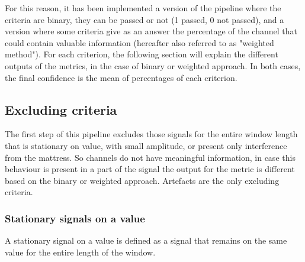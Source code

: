 For this reason, it has been implemented a version of the pipeline where the criteria are binary, they can be passed or not (1 passed, 0 not passed), and a version where some criteria give as an answer the percentage of the channel that could contain valuable information (hereafter also referred to as "weighted method"). For each criterion, the following section will explain the different outputs of the metrics, in the case of binary or weighted approach.
In both cases, the final confidence is the mean of percentages of each criterion.


\subsection{Excluding criteria}\label{cap:excCrit}
The first step of this pipeline excludes those signals for the entire window length that is stationary on value, with small amplitude, or present only interference from the mattress. So channels do not have meaningful information, in case this behaviour is present in a part of the signal the output for the metric is different based on the binary or weighted approach. Artefacts are the only excluding criteria.

\subsubsection*{Stationary signals on a value}\label{cap:stationary}
A stationary signal on a value is defined as a signal that remains on the same value for the entire length of the window.

